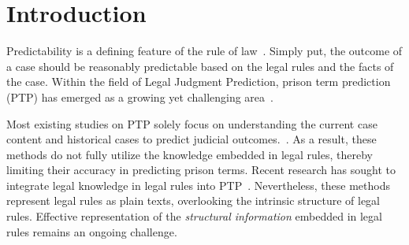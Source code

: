 \section{Introduction} \label{int}
Predictability is a defining feature of the rule of law~\cite{frost2015predictability}. Simply put, the outcome of a case should be reasonably predictable based on the legal rules and the facts of the case. Within the field of Legal Judgment Prediction, prison term prediction (PTP) has emerged as a growing yet challenging area~\cite{kim-2014-convolutional,DBLP:conf/ijcai/FengL022,DBLP:journals/access/CuiSW23,zhong-etal-2020-nlp}.

Most existing studies on PTP solely focus on understanding the current case content and historical cases to predict judicial outcomes.~\cite{devlin-etal-2019-bert,DBLP:conf/iclr/ClarkLLM20,Rformer,DBLP:conf/cicai/ZhouLWKZW22}. 
As a result, these methods do not fully utilize the knowledge embedded in legal rules, thereby limiting their accuracy in predicting prison terms.
Recent research has sought to integrate legal knowledge in legal rules into PTP~\cite{neurjudge,ML-LJP}. Nevertheless, these methods represent legal rules as plain texts, overlooking the intrinsic structure of legal rules.
Effective representation of the \emph{structural information} embedded in legal rules remains an ongoing challenge.

